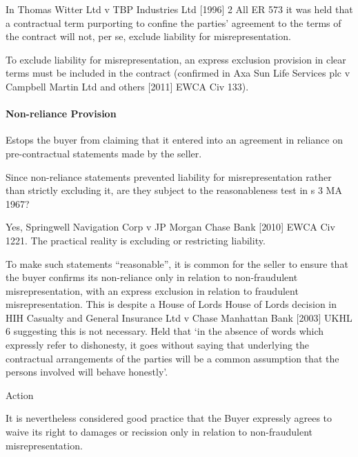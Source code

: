 \documentclass[
]{article}
\newenvironment{env-a57f3fff-c46d-4aeb-b36c-ada0d8066098}
{
    \savenotes\tcolorbox[blanker,breakable,left=5pt,borderline west={2pt}{-4pt}{aquamarine}]
}
{
    \endtcolorbox\spewnotes
}
\newenvironment{env-b56569b0-a3e1-47fe-b37c-6cf3ba4ee6a2}
{
    \savenotes\tcolorbox[blanker,breakable,left=5pt,borderline west={2pt}{-4pt}{gray}]
}
{
    \endtcolorbox\spewnotes
}
\begin{document}
In Thomas Witter Ltd v TBP Industries Ltd {[}1996{]} 2 All ER 573 it was
held that a contractual term purporting to confine the parties'
agreement to the terms of the contract will not, per se, exclude
liability for misrepresentation.

To exclude liability for misrepresentation, an express exclusion
provision in clear terms must be included in the contract (confirmed in
Axa Sun Life Services plc v Campbell Martin Ltd and others {[}2011{]}
EWCA Civ 133).

\hypertarget{non-reliance-provision}{%
\paragraph{Non-reliance Provision}\label{non-reliance-provision}}

Estops the buyer from claiming that it entered into an agreement in
reliance on pre-contractual statements made by the seller.

\begin{env-b56569b0-a3e1-47fe-b37c-6cf3ba4ee6a2}

Since non-reliance statements prevented liability for misrepresentation
rather than strictly excluding it, are they subject to the
reasonableness test in s 3 MA 1967?

Yes, Springwell Navigation Corp v JP Morgan Chase Bank {[}2010{]} EWCA
Civ 1221. The practical reality is excluding or restricting liability.

\end{env-b56569b0-a3e1-47fe-b37c-6cf3ba4ee6a2}

To make such statements ``reasonable'', it is common for the seller to
ensure that the buyer confirms its non-reliance only in relation to
non-fraudulent misrepresentation, with an express exclusion in relation
to fraudulent misrepresentation. This is despite a House of Lords House
of Lords decision in HIH Casualty and General Insurance Ltd v Chase
Manhattan Bank {[}2003{]} UKHL 6 suggesting this is not necessary. Held
that `in the absence of words which expressly refer to dishonesty, it
goes without saying that underlying the contractual arrangements of the
parties will be a common assumption that the persons involved will
behave honestly'.

\begin{env-a57f3fff-c46d-4aeb-b36c-ada0d8066098}

Action

It is nevertheless considered good practice that the Buyer expressly
agrees to waive its right to damages or recission only in relation to
non-fraudulent misrepresentation.

\end{env-a57f3fff-c46d-4aeb-b36c-ada0d8066098}
\end{document}
